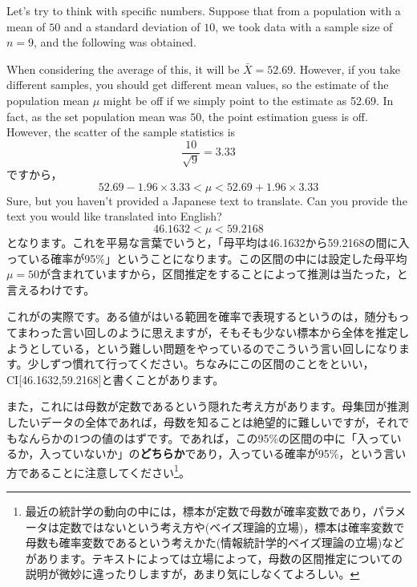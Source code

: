 \documentclass{ltjsbook}
\begin{document}
Let's try to think with specific numbers. Suppose that from a population with a mean of $50$ and a standard deviation of $10$, we took data with a sample size of $n=9$, and the following was obtained.

When considering the average of this, it will be $\bar{X}=52.69$. However, if you take different samples, you should get different mean values, so the estimate of the population mean $\mu$ might be off if we simply point to the estimate as 52.69. In fact, as the set population mean was $50$, the point estimation guess is off. However, the scatter of the sample statistics is
\[\frac{10}{\sqrt{9}}=3.33\]
ですから，
\[ 52.69 - 1.96 \times 3.33 < \mu < 52.69+1.96\times 3.33 \]
Sure, but you haven't provided a Japanese text to translate. Can you provide the text you would like translated into English?
\[ 46.1632 < \mu < 59.2168\]
となります。これを平易な言葉でいうと，「母平均は46.1632から59.2168の間に入っている確率が95\%」ということになります。この区間の中には設定した母平均$\mu=50$が含まれていますから，区間推定をすることによって推測は当たった，と言えるわけです。

これがの実際です。ある値がはいる範囲を確率で表現するというのは，随分もってまわった言い回しのように思えますが，そもそも少ない標本から全体を推定しようとしている，という難しい問題をやっているのでこういう言い回しになります。少しずつ慣れて行ってください。ちなみにこの区間のことをといい，CI[46.1632,59.2168]と書くことがあります。


また，これには母数が定数であるという隠れた考え方があります。母集団が推測したいデータの全体であれば，母数を知ることは絶望的に難しいですが，それでもなんらかの1つの値のはずです。であれば，この95\%の区間の中に「入っているか，入っていないか」の\textbf{どちらか}であり，入っている確率が95\%，という言い方であることに注意してください\footnote{最近の統計学の動向の中には，標本が定数で母数が確率変数であり，パラメータは定数ではないという考え方や(ベイズ理論的立場)，標本は確率変数で母数も確率変数であるという考えかた(情報統計学的ベイズ理論の立場)などがあります。テキストによっては立場によって，母数の区間推定についての説明が微妙に違ったりしますが，あまり気にしなくてよろしい。}。
\end{document}
